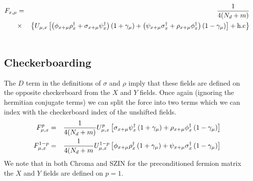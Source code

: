 \documentclass[12pt]{article}
\begin{document}
\begin{eqnarray}
F_{x,\mu} &=& \frac{1}{4(N_d + m)} \nonumber \\
&\times& \left\{ U_{\mu,x} \left[ \left( \phi_{x+\mu} \rho^{\dagger}_{x} + \sigma_{x+\mu} \psi^{\dagger}_{x} \right)  (1 + \gamma_{\mu}) +  \left( \psi_{x+\mu} \sigma^{\dagger}_x + \rho_{x+\mu} \phi^{\dagger}_x \right) (1 - \gamma_{\mu}) \right] + \mbox{h.c} \right\} \nonumber \\
& &
\end{eqnarray}

\subsection{Checkerboarding}
The $D$ term in the definitions of $\sigma$ and $\rho$ imply that these
fields are defined on the opposite checkerboard from the $X$ and $Y$ fields.
Once again (ignoring the hermitian conjugate terms) we can split the force 
into two terms which we can index with the checkerboard index of the 
unshifted fields.
\begin{eqnarray}
F^{p}_{\mu,x} &=& \frac{1}{4(N_d + m)} U^{p}_{\mu,x} \left[ \sigma_{x+\mu} \psi^{\dagger}_{x} \left( 1 + \gamma_{\mu} \right) + \rho_{x+\mu} \phi^{\dagger}_{x} \left( 1 - \gamma_{\mu} \right) \right] \\
F^{1-p}_{\mu,x} &=& \frac{1}{4(N_d + m} U^{1-p}_{\mu,x} \left[ \phi_{x+\mu} \rho^{\dagger}_{x} \left( 1 + \gamma_{\mu} \right) + \psi_{x + \mu} \sigma^{\dagger}_{x} \left( 1 - \gamma_{\mu} \right) \right]
\end{eqnarray}
We note that in both Chroma and SZIN for the preconditioned fermion matrix
the $X$ and $Y$ fields are defined on $p=1$.
\end{document}
